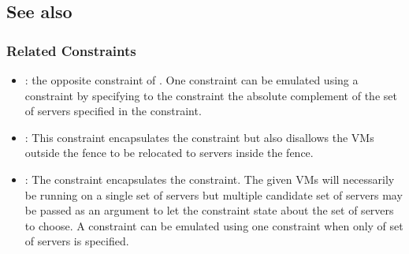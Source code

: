 \subsection{See also}

\subsubsection{Related Constraints}
\begin{itemize}
\item {}: the opposite constraint of .
One  constraint can be emulated using a  constraint by specifying to the  
constraint the absolute complement of the set of servers specified in the  constraint.

\item {}: This constraint encapsulates the  constraint but also disallows the VMs outside the fence to be relocated to servers inside the fence.

\item {}: The  constraint encapsulates the  constraint.
The given VMs will necessarily be running on a single set of servers but multiple candidate set of servers may be passed as an argument to let the  constraint state about the set of servers to choose. A  constraint can be emulated using one  constraint when only of set of servers is specified.
\end{itemize}

